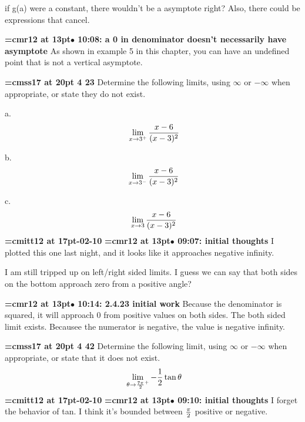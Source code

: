 if g(a) were a constant, there wouldn't be a asymptote right? Also, there could be expressions that cancel.
\par

{\smallskip\noindent\bf\font\titlefont=cmr12 at 13pt\titlefont $\bullet$ 10:08: a 0 in denominator doesn't necessarily have asymptote}\smallskip
As shown in example 5 in this chapter, you can have an undefined point that is not a vertical asymptote.
\par

{\medskip\noindent\bf\font\titlefont=cmss17 at 20pt 4 23}\medskip
Determine the following limits, using $\infty$ or $-\infty$ when
appropriate, or state they do not exist.
\par a. $$\
\lim_{x \to 3^{+}}{
x - 6
\over
(x - 3)^2
}
$$
\par b. $$\
\lim_{x \to 3^{-}}{
x - 6
\over
(x - 3)^2
}
$$
\par c.$$\
\lim_{x \to 3}{
x - 6
\over
(x - 3)^2
}
$$
{\medskip\noindent\bf\font\titlefont=cmitt12 at 17pt-02-10}\medskip
{\smallskip\noindent\bf\font\titlefont=cmr12 at 13pt\titlefont $\bullet$ 09:07: initial thoughts}\smallskip
I plotted this one last night, and it looks like it approaches negative infinity.
\par

I am still tripped up on left/right sided limits. I guess we can say that both sides on the bottom approach zero from a positive angle?
\par

{\smallskip\noindent\bf\font\titlefont=cmr12 at 13pt\titlefont $\bullet$ 10:14: 2.4.23 initial work}\smallskip
Because the denominator is squared, it will approach 0 from positive values on both sides. The both sided limit exists. Becausee the numerator is negative, the value is negative infinity.
\par

\xrdef{node11}
{\medskip\noindent\bf\font\titlefont=cmss17 at 20pt 4 42}\medskip
Determine the following limit, using $\infty$ or $-\infty$
when appropriate, or state that it does not exist.
$$\
\lim_{\theta \to {7\pi \over 2}^{+}}-{
1
\over
2
}\tan \theta
$$
{\medskip\noindent\bf\font\titlefont=cmitt12 at 17pt-02-10}\medskip
{\smallskip\noindent\bf\font\titlefont=cmr12 at 13pt\titlefont $\bullet$ 09:10: initial thoughts}\smallskip
I forget the behavior of tan. I think it's bounded between $\pi \over 2$ positive or negative.
\par

